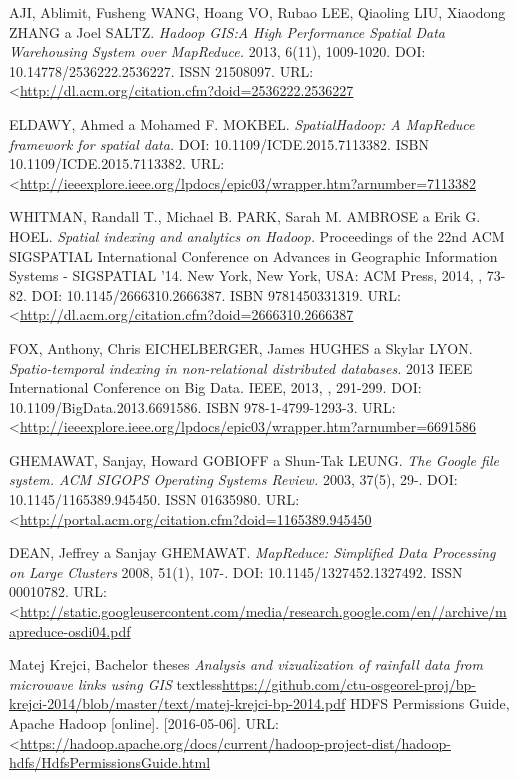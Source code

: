 \documentclass[a4paper,12pt,oneside]{report}
\begin{document}
\begin{thebibliography}{99}
		
		AJI, Ablimit, Fusheng WANG, Hoang VO, Rubao LEE, Qiaoling LIU, Xiaodong ZHANG a
		Joel SALTZ. \textit{Hadoop GIS:A High Performance Spatial Data Warehousing
			System over MapReduce.} 2013, 6(11), 1009-1020. DOI: 10.14778/2536222.2536227.
		ISSN 21508097.  URL: 
		\textless\url{http://dl.acm.org/citation.cfm?doid=2536222.2536227}
		
		ELDAWY, Ahmed a Mohamed F. MOKBEL. \textit{SpatialHadoop: A MapReduce framework
			for spatial data.} DOI: 10.1109/ICDE.2015.7113382. ISBN
		10.1109/ICDE.2015.7113382. URL: 
		\textless\url{http://ieeexplore.ieee.org/lpdocs/epic03/wrapper.htm?arnumber=7113382}
		
		WHITMAN, Randall T., Michael B. PARK, Sarah M. AMBROSE a Erik G. HOEL.
		\textit{Spatial indexing and analytics on Hadoop.} Proceedings of the 22nd ACM
		SIGSPATIAL International Conference on Advances in Geographic Information
		Systems - SIGSPATIAL '14. New York, New York, USA: ACM Press, 2014, , 73-82.
		DOI: 10.1145/2666310.2666387. ISBN 9781450331319. URL: 
		\textless\url{http://dl.acm.org/citation.cfm?doid=2666310.2666387}
		
		FOX, Anthony, Chris EICHELBERGER, James HUGHES a Skylar LYON.
		\textit{Spatio-temporal indexing in non-relational distributed databases.} 2013
		IEEE International Conference on Big Data. IEEE, 2013, , 291-299. DOI:
		10.1109/BigData.2013.6691586. ISBN 978-1-4799-1293-3. URL: 
		\textless\url{http://ieeexplore.ieee.org/lpdocs/epic03/wrapper.htm?arnumber=6691586}
		
		GHEMAWAT, Sanjay, Howard GOBIOFF a Shun-Tak LEUNG. \textit{The Google file
			system. ACM SIGOPS Operating Systems Review.} 2003, 37(5), 29-. DOI:
		10.1145/1165389.945450. ISSN 01635980.  URL: 
		\textless\url{http://portal.acm.org/citation.cfm?doid=1165389.945450}
		
		DEAN, Jeffrey a Sanjay GHEMAWAT. \textit{MapReduce: Simplified Data Processing
			on Large Clusters}  2008, 51(1), 107-. DOI: 10.1145/1327452.1327492. ISSN
		00010782. URL: 
		\textless\url{http://static.googleusercontent.com/media/research.google.com/en//archive/mapreduce-osdi04.pdf}
		
		Matej Krejci, Bachelor theses \textit{Analysis and vizualization of rainfall data from microwave links using GIS} 
		textless\url{https://github.com/ctu-osgeorel-proj/bp-krejci-2014/blob/master/text/matej-krejci-bp-2014.pdf}
		HDFS Permissions Guide, Apache Hadoop  [online]. [2016-05-06]. URL: 
		\textless\url{https://hadoop.apache.org/docs/current/hadoop-project-dist/hadoop-hdfs/HdfsPermissionsGuide.html}
		

\end{thebibliography}
\end{document}
